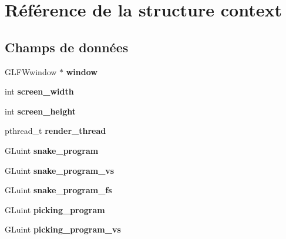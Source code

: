 \hypertarget{structcontext}{\section{Référence de la structure context}
\label{structcontext}
}
\subsection*{Champs de données}
\begin{DoxyCompactItemize}
\item 
\hypertarget{structcontext_a80de27bd7dc4e2b2ad3d5895b97a70f0}{G\-L\-F\-Wwindow $\ast$ {\bfseries window}}\label{structcontext_a80de27bd7dc4e2b2ad3d5895b97a70f0}

\item 
\hypertarget{structcontext_aa4d434a8b93410ea0ed660e48dac41c6}{int {\bfseries screen\-\_\-width}}\label{structcontext_aa4d434a8b93410ea0ed660e48dac41c6}

\item 
\hypertarget{structcontext_a3b4a1bd850991355b91c7bfc15247d49}{int {\bfseries screen\-\_\-height}}\label{structcontext_a3b4a1bd850991355b91c7bfc15247d49}

\item 
\hypertarget{structcontext_ac223398d564a4c19d0f8a50a4433489f}{pthread\-\_\-t {\bfseries render\-\_\-thread}}\label{structcontext_ac223398d564a4c19d0f8a50a4433489f}

\item 
\hypertarget{structcontext_aa92054dddc3b6e428b54520b2ac939e2}{G\-Luint {\bfseries snake\-\_\-program}}\label{structcontext_aa92054dddc3b6e428b54520b2ac939e2}

\item 
\hypertarget{structcontext_a22cf828c2b69113a409f520a663b0722}{G\-Luint {\bfseries snake\-\_\-program\-\_\-vs}}\label{structcontext_a22cf828c2b69113a409f520a663b0722}

\item 
\hypertarget{structcontext_a64751d53f9aa1eb5fd363df539cdb647}{G\-Luint {\bfseries snake\-\_\-program\-\_\-fs}}\label{structcontext_a64751d53f9aa1eb5fd363df539cdb647}

\item 
\hypertarget{structcontext_a0fa1e2cf7849b9bc36ecd9d84ef588c5}{G\-Luint {\bfseries picking\-\_\-program}}\label{structcontext_a0fa1e2cf7849b9bc36ecd9d84ef588c5}

\item 
\hypertarget{structcontext_a8403ba5fd00d853f1c6ef8c32ddf625f}{G\-Luint {\bfseries picking\-\_\-program\-\_\-vs}}\label{structcontext_a8403ba5fd00d853f1c6ef8c32ddf625f}


\end{DoxyCompactItemize}
